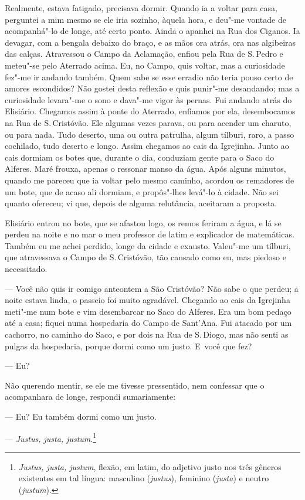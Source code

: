 \begin{linenumbers}
Realmente, estava fatigado, precisava dormir. Quando ia a voltar para
casa, perguntei a mim mesmo se ele iria sozinho, àquela hora, e deu"-me
vontade de acompanhá"-lo de longe, até certo ponto. Ainda o apanhei na
Rua dos Ciganos. Ia devagar, com a bengala debaixo do braço, e as mãos
ora atrás, ora nas algibeiras das calças. Atravessou o Campo da
Aclamação, enfiou pela Rua de S.\,Pedro e meteu"-se pelo Aterrado acima.
Eu, no Campo, quis voltar, mas a curiosidade fez"-me ir andando também.
Quem sabe se esse erradio não teria pouso certo de amores escondidos?
Não gostei desta reflexão e quis punir"-me desandando; mas a curiosidade
levara"-me o sono e dava"-me vigor às pernas. Fui andando atrás do
Elisiário. Chegamos assim à ponte do Aterrado, enfiamos por ela,
desembocamos na Rua de S.\,Cristóvão. Ele algumas vezes parava, ou para
acender um charuto, ou para nada. Tudo deserto, uma ou outra patrulha,
algum tílburi, raro, a passo cochilado, tudo deserto e longo. Assim
chegamos ao cais da Igrejinha. Junto ao cais dormiam os botes que,
durante o dia, conduziam gente para o Saco do Alferes. Maré frouxa,
apenas o ressonar manso da água. Após alguns minutos, quando me pareceu
que ia voltar pelo mesmo caminho, acordou os remadores de um bote, que
de acaso ali dormiam, e propôs"-lhes levá"-lo à cidade. Não sei quanto
ofereceu; vi que, depois de alguma relutância, aceitaram a proposta.

Elisiário entrou no bote, que se afastou logo, os remos feriram a água,
e lá se perdeu na noite e no mar o meu professor de latim e explicador
de matemáticas. Também eu me achei perdido, longe da cidade e exausto.
Valeu"-me um tílburi, que atravessava o Campo de S.\,Cristóvão, tão
cansado como eu, mas piedoso e necessitado.

--- Você não quis ir comigo anteontem a São Cristóvão? Não sabe o que
perdeu; a noite estava linda, o passeio foi muito agradável. Chegando ao
cais da Igrejinha meti"-me num bote e vim desembarcar no Saco do Alferes.
Era um bom pedaço até a casa; fiquei numa hospedaria do Campo de
Sant'Ana. Fui atacado por um cachorro, no caminho do Saco, e por dois na
Rua de S.\,Diogo, mas não senti as pulgas da hospedaria, porque dormi
como um justo. E~você que fez?

--- Eu?

Não querendo mentir, se ele me tivesse pressentido, nem confessar que o
acompanhara de longe, respondi sumariamente:

--- Eu? Eu também dormi como um justo.

--- \emph{Justus, justa, justum}.\footnote{\emph{Justus, justa, justum},
  flexão, em latim, do adjetivo justo nos três gêneros existentes em tal língua: masculino
  (\emph{justus}), feminino (\emph{justa}) e neutro (\emph{justum}).}


\end{linenumbers}
